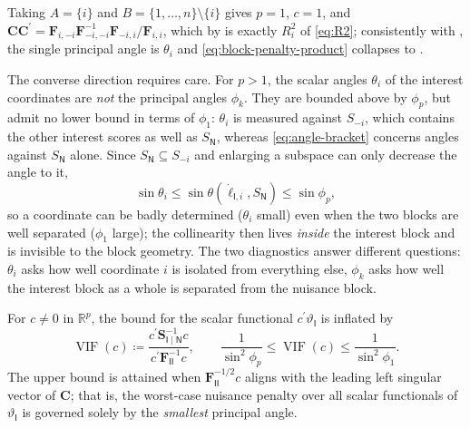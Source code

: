 \documentclass{IEEEtran}
\begin{document}
\begin{remark}
  \label{rem:scalar-from-block}
  Taking $A = \{i\}$ and $B = \{1,\ldots,n\}\setminus\{i\}$ gives $p=1$, $c=1$, and $\mathbf{C}\mathbf{C}^{\prime} = \mathbf{F}_{i,-i}\mathbf{F}_{-i,-i}^{-1}\mathbf{F}_{-i,i}/\mathbf{F}_{i,i}$, which by  is exactly $R_{i}^{2}$ of \eqref{eq:R2}; consistently with , the single principal angle is $\theta_{i}$ and \eqref{eq:block-penalty-product} collapses to .

  The converse direction requires care. For $p > 1$, the scalar angles $\theta_{i}$ of the interest coordinates are \emph{not} the principal angles $\phi_{k}$. They are bounded above by $\phi_{p}$, but admit no lower bound in terms of $\phi_{1}$: $\theta_{i}$ is measured against $S_{-i}$, which contains the other interest scores as well as $S_{\mathsf{N}}$, whereas \eqref{eq:angle-bracket} concerns angles against $S_{\mathsf{N}}$ alone. Since $S_{\mathsf{N}} \subseteq S_{-i}$ and enlarging a subspace can only decrease the angle to it,
  \begin{equation}
    \sin\theta_{i} \le \sin\theta(\dot{\ell}_{\mathsf{I},i}, S_{\mathsf{N}}) \le \sin\phi_{p} ,
    \label{eq:theta-phi-order}
  \end{equation}
  so a coordinate can be badly determined ($\theta_{i}$ small) even when the two blocks are well separated ($\phi_{1}$ large); the collinearity then lives \emph{inside} the interest block and is invisible to the block geometry. The two diagnostics answer different questions: $\theta_{i}$ asks how well coordinate $i$ is isolated from everything else, $\phi_{k}$ asks how well the interest block as a whole is separated from the nuisance block.
\end{remark}

\begin{proposition}
  \label{prop:block-vif}
  For $c \neq 0$ in $\mathbb{R}^{p}$, the bound for the scalar functional $c^{\prime}\vartheta_{\mathsf{I}}$ is inflated by
  \begin{equation}
    \operatorname{VIF}(c)
    \coloneq
    \frac{c^{\prime}\mathbf{S}_{\mathsf{I}\mid\mathsf{N}}^{-1}c}{c^{\prime}\mathbf{F}_{\mathsf{II}}^{-1}c},
    \qquad
    \frac{1}{\sin^{2}\phi_{p}} \le \operatorname{VIF}(c) \le \frac{1}{\sin^{2}\phi_{1}} .
    \label{eq:block-vif}
  \end{equation}
  The upper bound is attained when $\mathbf{F}_{\mathsf{II}}^{-1/2}c$ aligns with the leading left singular vector of $\mathbf{C}$; that is, the worst-case nuisance penalty over all scalar functionals of $\vartheta_{\mathsf{I}}$ is governed solely by the \emph{smallest} principal angle.
\end{proposition}
\end{document}
